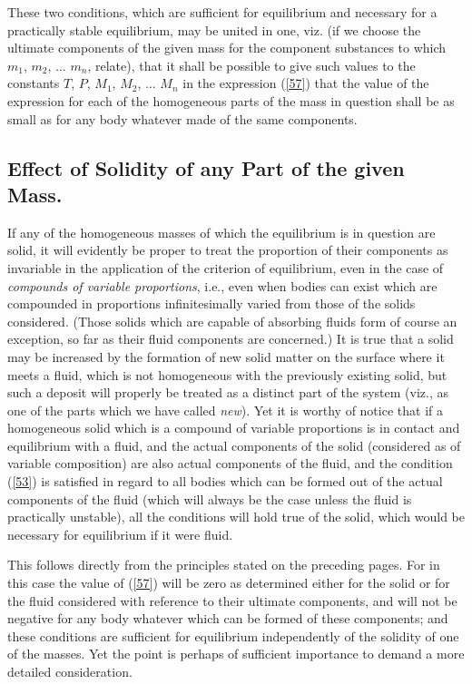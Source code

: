 \documentclass[12pt]{article}
\begin{document}
These two conditions, which are sufficient for equilibrium and necessary for a practically stable equilibrium, may be united in one, viz. (if we choose the ultimate components of the given mass for the component substances to which $m_1$, $m_2$, ... $m_n$, relate), that it shall be possible to give such values to the constants $T$, $P$, $M_1$, $M_2$, ... $M_n$ in the expression (\ref{57}) that the value of the expression for each of the homogeneous parts of the mass in question shall be as small as for any body whatever made of the same components.

\subsection{Effect of Solidity of any Part of the given Mass.}
If any of the homogeneous masses of which the equilibrium is in question are solid, it will evidently be proper to treat the proportion of their components as invariable in the application of the criterion of equilibrium, even in the case of \textit{compounds of variable proportions}, i.e., even when bodies can exist which are compounded in proportions infinitesimally varied from those of the solids considered. (Those solids which are capable of absorbing fluids form of course an exception, so far as their fluid components are concerned.) It is true that a solid may be increased by the formation of new solid matter on the surface where it meets a fluid, which is not homogeneous with the previously existing solid, but such a deposit will properly be treated as a distinct part of the system (viz., as one of the parts which we have called \textit{new}). Yet it is worthy of notice that if a homogeneous solid which is a compound of variable proportions is in contact and equilibrium with a fluid, and the actual components of the solid (considered as of variable composition) are also actual components of the fluid, and the condition (\ref{53}) is satisfied in regard to all bodies which can be formed out of the actual components of the fluid (which will always be the case unless the fluid is practically unstable), all the conditions will hold true of the solid, which would be necessary for equilibrium if it were fluid.


This follows directly from the principles stated on the preceding pages. For in this case the value of (\ref{57}) will be zero as determined either for the solid or for the fluid considered with reference to their ultimate components, and will not be negative for any body whatever which can be formed of these components; and these conditions are sufficient for equilibrium independently of the solidity of one of the masses. Yet the point is perhaps of sufficient importance to demand a more detailed consideration.
\end{document}
